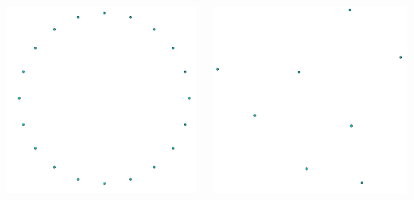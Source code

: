 \documentclass{beamer}
\begin{document}
\begin{frame}
\begin{columns}[T] %
    \begin{column}{.5\textwidth}
        \includegraphics[width=\textwidth]{static/shell.png}

        \end{column}%
    \begin{column}{.6\textwidth}
        \includegraphics[width=\textwidth]{static/sedgewick.png}


\end{column}
\end{columns}
\end{frame}
\end{document}
